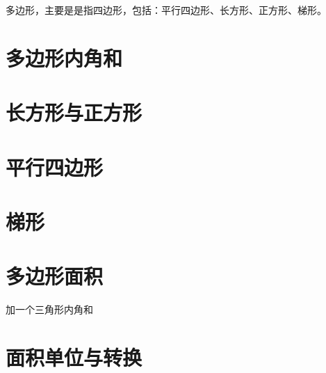 \setcounter{section}{0}


\begin{parchmentquote}
   多边形，主要是是指四边形，包括：平行四边形、长方形、正方形、梯形。
\end{parchmentquote}





\section{多边形内角和}
\section{长方形与正方形}
\section{平行四边形}
\section{梯形}
\section{多边形面积}
加一个三角形内角和
\section{面积单位与转换}




\newpage